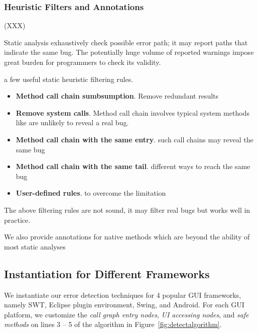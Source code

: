 \subsubsection{Heuristic Filters and Annotations}
(XXX)

Static analysis exhaustively check possible error path; it may report
paths that indicate the same bug. The potentially huge volume of
reported warnings impose great burden for programmers to check
its validity. 

a few useful static heuristic filtering rules.

\begin{itemize}
\item \textbf{Method call chain sumbsumption}. Remove redundant
results

\item \textbf{Remove system calls}. Method call chain involves typical
system methods like  are unlikely to reveal a real bug.

\item \textbf{Method call chain with the same entry}. such
call chains may reveal the same bug

\item \textbf{Method call chain with the same tail}.  different ways
to reach the same bug

\item \textbf{User-defined rules}.  to overcome the limitation

\end{itemize}

The above filtering rules are not sound, it may filter real bugs but works
well in practice.

We also provide annotations for native methods which are beyond the ability
of most static analyses

\subsection{Instantiation for Different Frameworks}
\label{sec:platforms}

We instantiate our error detection techniques for 4 popular GUI frameworks,
namely SWT, Eclipse plugin environment, Swing, and Android.
For each GUI platform, we customize the \textit{call graph entry nodes},
\textit{UI accessing nodes}, and \textit{safe methods} on lines 3 -- 5 of the
algorithm in Figure~\ref{fig:detectalgorithm}.


